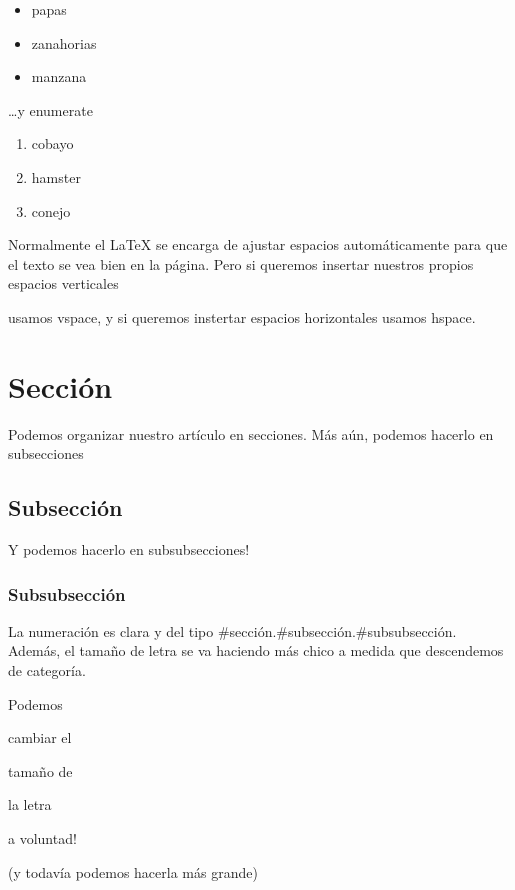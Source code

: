 \documentclass[11pt,a4paper]{article} %
\begin{document}
\begin{itemize}
 \item papas
 \item zanahorias
 \item manzana
\end{itemize}

\ldots y enumerate   %

\begin{enumerate}
 \item cobayo
 \item hamster
 \item conejo
\end{enumerate}

 

Normalmente el \LaTeX{} se encarga de ajustar espacios autom\'aticamente para que el texto se vea bien en la p\'agina. Pero si queremos insertar nuestros propios espacios verticales

\vspace{10mm}

usamos vspace, y si queremos instertar espacios horizontales \hspace{5mm} usamos hspace.


\section{Secci\'on}

Podemos organizar nuestro art\'iculo en secciones. M\'as a\'un, podemos hacerlo en subsecciones

\subsection{Subsecci\'on}

Y podemos hacerlo en subsubsecciones!

\subsubsection{Subsubsecci\'on}


La numeraci\'on es clara y del tipo \#secci\'on.\#subsecci\'on.\#subsubsecci\'on. Adem\'as, el tama\~no de letra se va haciendo m\'as chico a medida que descendemos de categor\'ia.

\vspace{5mm}

Podemos\begin{large} cambiar el \end{large} \begin{Large}tama\~no de                                           \end{Large} \begin{LARGE}la letra \end{LARGE} \begin{huge}a voluntad!  \end{huge} \begin{footnotesize}(y todav\'ia podemos hacerla m\'as grande)                                                                             \end{footnotesize}
\end{document}
